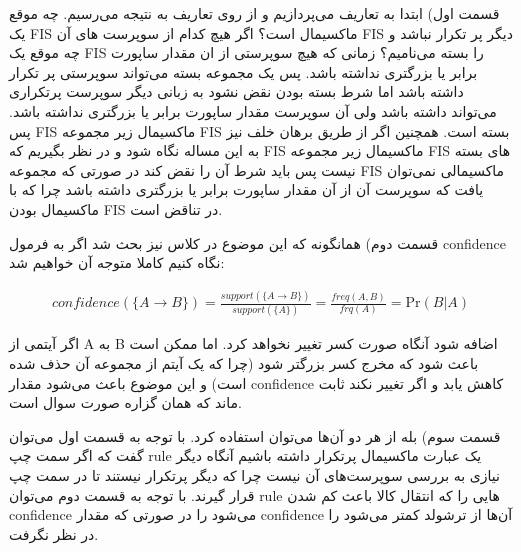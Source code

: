 \begin{sol}

قسمت اول) ابتدا به تعاریف می‌پردازیم و از روی تعاریف به نتیجه می‌رسیم. چه موقع یک FIS ماکسیمال است؟ اگر هیچ کدام از سوپرست های آن FIS دیگر پر تکرار نباشد و چه موقع یک FIS را بسته می‌نامیم؟ زمانی که هیچ سوپرستی از ان مقدار ساپورت برابر یا بزرگتری نداشته باشد.
پس یک مجموعه بسته می‌تواند سوپرستی پر تکرار داشته باشد اما شرط بسته بودن نقض نشود به زبانی دیگر سوپرست پرتکراری می‌تواند داشته باشد ولی آن سوپرست مقدار ساپورت برابر یا بزرگتری نداشته باشد. پس FIS ماکسیمال زیر مجموعه FIS بسته است. همچنین اگر از طریق برهان خلف نیز به این مساله نگاه شود و در نظر بگیریم که FIS ماکسیمال زیر مجموعه FIS های بسته نیست پس باید شرط آن را نقض کند در صورتی که مجموعه FIS ماکسیمالی نمی‌توان یافت که سوپرست آن از آن مقدار ساپورت برابر یا بزرگتری داشته باشد چرا که با ماکسیمال بودن FIS در تناقض است.


قسمت دوم) همانگونه که این موضوع در کلاس نیز بحث شد اگر به فرمول confidence نگاه کنیم کاملا متوجه آن خواهیم شد:

\begin{align*}
confidence (\{A \rightarrow B \}) =
\frac{support (\{A \rightarrow B \})}{support (\{A\})} = \frac{freq(A,B)}{frq(A)} = \mathrm{Pr} (B | A)
\end{align*}

اگر آیتمی از A  به B  اضافه شود آنگاه صورت کسر تغییر نخواهد کرد. اما ممکن است باعث شود که مخرج کسر بزرگتر شود (چرا که یک آیتم از مجموعه آن حذف شده است) و این موضوع باعث می‌شود مقدار confidence کاهش یابد و اگر تغییر نکند ثابت ماند که همان گزاره صورت سوال است.

قسمت سوم) بله از هر دو آن‌ها می‌توان استفاده کرد.
با توجه به قسمت اول می‌توان گفت که اگر سمت چپ rule یک عبارت ماکسیمال پرتکرار داشته باشیم آنگاه دیگر نیازی به بررسی سوپرست‌های آن نیست چرا که دیگر پرتکرار نیستند تا در سمت چپ قرار گیرند.
با توجه به قسمت دوم می‌توان rule هایی را که انتقال کالا باعث کم شدن confidence می‌شود را در صورتی که مقدار confidence آن‌ها از ترشولد کمتر می‌شود را در نظر نگرفت.

\end{sol}

